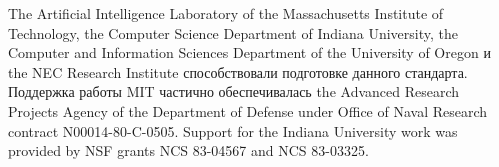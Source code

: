 \vest The Artificial Intelligence Laboratory of the
Massachusetts Institute of Technology, the Computer Science
Department of Indiana University, the Computer and Information
Sciences Department of the University of Oregon и the NEC Research
Institute способствовали подготовке данного стандарта.  Поддержка работы MIT
частично обеспечивалась
the Advanced Research Projects Agency of the Department of Defense under Office
of Naval Research contract N00014-80-C-0505.  Support for the Indiana
University work was provided by NSF grants NCS 83-04567 and NCS
83-03325.



